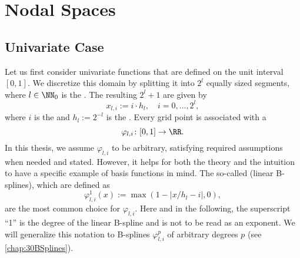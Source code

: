 \section{Nodal Spaces}

\subsection{Univariate Case}

Let us first consider univariate functions
that are defined on the unit interval $[0, 1]$.
%
We discretize this domain by splitting it into $2^l$ equally sized segments,
where $l \in \NN_0$ is the .
%
%
%
The resulting $2^l + 1$  are given by
\begin{equation}
  x_{l,i} := i \cdot h_l,\quad
  i = 0, \dotsc, 2^l,
\end{equation}
where $i$ is the  and $h_l := 2^{-l}$ is the .
%
Every grid point is associated with a 
\begin{equation}
  \varphi_{l,i}\colon [0, 1] \to \RR.
\end{equation}
In this thesis, we assume $\varphi_{l,i}$ to be arbitrary,
satisfying required assumptions when needed and stated.
However, it helps for both the theory and the intuition to have a
specific example of basis functions in mind.
%
The so-called  (linear B-splines), which are defined as
\begin{equation}
  \label{eq:hatFunctionUV}
  \varphi_{l,i}^1(x)
  := \max(1 - |x/h_l - i|, 0),
\end{equation}
are the most common choice for $\varphi_{l,i}$.
Here and in the following,
the superscript ``1'' is the degree of the linear B-spline and
is not to be read as an exponent.
We will generalize this notation to B-splines $\varphi_{l,i}^p$ of
arbitrary degrees $p$ (see \cref{chap:30BSplines}).

